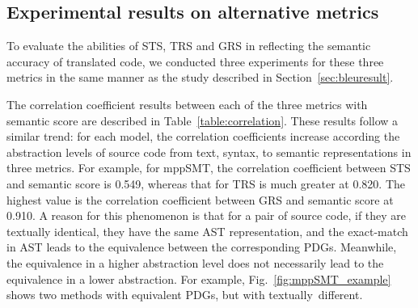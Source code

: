\subsection{Experimental results on alternative metrics}


To evaluate the abilities of STS, TRS and GRS in reflecting the
semantic accuracy of translated code, we conducted three experiments
for these three metrics in the same manner as the study described in
Section~\ref{sec:bleuresult}.

The correlation coefficient results between each of the three metrics
with semantic score are described in
Table~\ref{table:correlation}. These results follow a similar trend:
for each model, the correlation coefficients increase 
according the abstraction levels of source code from text, syntax, to semantic
representations in three metrics. For example, for mppSMT, the correlation
coefficient between STS and semantic score is 0.549, whereas that
for TRS is much greater at 0.820. The highest value is the
correlation coefficient between GRS and semantic score at 0.910. A
reason for this phenomenon is that for a pair of source code, if they
are textually identical, they have the same AST representation, and
the exact-match in AST leads to the equivalence between the
corresponding PDGs. Meanwhile, the equivalence in a higher
abstraction level does not necessarily lead to the equivalence in a
lower abstraction. For example, Fig.~\ref{fig:mppSMT_example} shows
two methods with equivalent PDGs, but with textually~different. 


